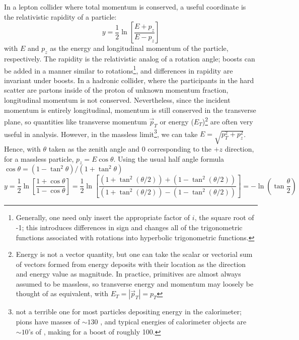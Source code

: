 In a lepton collider where total momentum is conserved, a useful coordinate is the relativistic rapidity of a particle:
\begin{equation}
y=\frac{1}{2}\ln\left[\frac{E+p_z}{E-p_z}\right]
\end{equation}
with $E$ and $p_z$ as the energy and longitudinal momentum of the particle, respectively.  The rapidity is the relativistic analog of a rotation angle; boosts can be added in a manner similar to rotations\footnote{Generally, one need only insert the appropriate factor of $i$, the square root of -1; this introduces differences in sign and changes all of the trigonometric functions associated with rotations into hyperbolic trigonometric functions.}, and differences in rapidity are invariant under boosts.  In a hadronic collider, where the participants in the hard scatter are partons inside of the proton of unknown momentum fraction, longitudinal momentum is not conserved.  Nevertheless, since the incident momentum is entirely longitudinal, momentum is still conserved in the transverse plane, so quantities like transverse momentum $\vec{p}_T$ or energy ($E_T$)\footnote{Energy is not a vector quantity, but one can take the scalar or vectorial sum of vectors formed from energy deposits with their location as the direction and energy value as magnitude.  In practice, primitives are almost always assumed to be massless, so transverse energy and momentum may loosely be thought of as equivalent, with $E_T=\left|\vec{p}_T\right|=p_T$} are often very useful in analysis.  However, in the massless limit\footnote{not a terrible one for most particles depositing energy in the calorimeter; pions have masses of $\sim130$ \MeV, and typical energies of calorimeter objects are $\sim10$'s of \GeV, making for a boost of roughly 100.}, we can take $E=\sqrt{p_T^2+p_z^2}$.  Hence, with $\theta$ taken as the zenith angle and 0 corresponding to the $+z$ direction, for a massless particle, $p_z=E\cos\theta$.  Using the usual half angle formula $\cos\theta=(1-\tan^2\theta)/(1+\tan^2\theta)$
\begin{equation}
y=\frac{1}{2}\ln\left[\frac{1+\cos\theta}{1-\cos\theta}\right]=\frac{1}{2}\ln\left[\frac{\left(1+\tan^2\left(\theta/2\right)\right)+\left(1-\tan^2\left(\theta/2\right)\right)}{\left(1+\tan^2\left(\theta/2\right)\right)-\left(1-\tan^2\left(\theta/2\right)\right)}\right]=-\ln\left(\tan\frac{\theta}{2}\right)%
\end{equation}

